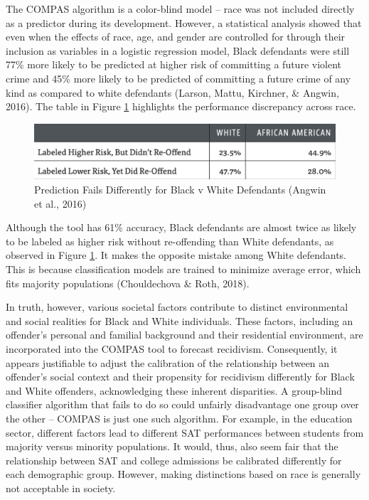 \documentclass[12pt, twoside]{amherstthesis}
\begin{document}
The COMPAS algorithm is a color-blind model -- race was not included directly as a predictor during its development. However, a statistical analysis showed that even when the effects of race, age, and gender are controlled for through their inclusion as variables in a logistic regression model, Black defendants were still 77\% more likely to be predicted at higher risk of committing a future violent crime and 45\% more likely to be predicted of committing a future crime of any kind as compared to white defendants (Larson, Mattu, Kirchner, \& Angwin, 2016). The table in Figure \ref{fig:compas1} highlights the performance discrepancy across race.
\begin{figure}

{\centering \includegraphics[width=1\linewidth]{figures/compas1} 

}

\caption[COMPAS Prediction Fails Differently for Black v White Defendants]{Prediction Fails Differently for Black v White Defendants (Angwin et al., 2016)}\label{fig:compas1}
\end{figure}
Although the tool has 61\% accuracy, Black defendants are almost twice as likely to be labeled as higher risk without re-offending than White defendants, as observed in Figure \ref{fig:compas1}. It makes the opposite mistake among White defendants. This is because classification models are trained to minimize average error, which fits majority populations (Chouldechova \& Roth, 2018).

In truth, however, various societal factors contribute to distinct environmental and social realities for Black and White individuals. These factors, including an offender's personal and familial background and their residential environment, are incorporated into the COMPAS tool to forecast recidivism. Consequently, it appears justifiable to adjust the calibration of the relationship between an offender's social context and their propensity for recidivism differently for Black and White offenders, acknowledging these inherent disparities. A group-blind classifier algorithm that fails to do so could unfairly disadvantage one group over the other -- COMPAS is just one such algorithm. For example, in the education sector, different factors lead to different SAT performances between students from majority versus minority populations. It would, thus, also seem fair that the relationship between SAT and college admissions be calibrated differently for each demographic group. However, making distinctions based on race is generally not acceptable in society.
\end{document}
